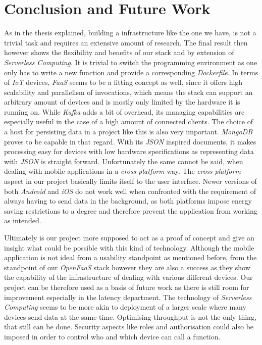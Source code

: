 \section{Conclusion and Future Work}
\label{sec:conclusion}

As in the thesis explained, building a infrastructure like the one we have, is not a trivial task
and requires an extensive amount of research. The final result then however shows the flexibility
and benefits of our stack and by extension of \textit{Serverless Computing}. It is trivial to switch
the programming environment as one only has to write a new function and provide a corresponding
\textit{Dockerfile}. In terms of \textit{IoT} devices, \textit{FaaS} seems to be a fitting concept
as well, since it offers high scalability and parallelism of invocations, which means the stack can
support an arbitrary amount of devices and is mostly only limited by the hardware it is running on.
While \textit{Kafka} adds a bit of overhead, its managing capabilities are especially useful in the
case of a high amount of connected clients. The choice of a host for persisting data in a project
like this is also very important. \textit{MongoDB} proves to be capable in that regard. With its
\textit{JSON} inspired documents, it makes processing easy for devices with low hardware
specifications as representing data with \textit{JSON} is straight forward. Unfortunately the same
cannot be said, when dealing with mobile applications in a \textit{cross platform} way. The
\textit{cross platform} aspect in our project basically limits itself to the user interface. Newer
versions of both \textit{Android} and \textit{iOS} do not work well when confronted with the
requirement of always having to send data in the background, as both platforms impose energy saving
restrictions to a degree and therefore prevent the application from working as intended.

Ultimately is our project more supposed to act as a proof of concept and give an insight what could
be possible with this kind of technology. Although the mobile application is not ideal from a
usability standpoint as mentioned before, from the standpoint of our \textit{OpenFaaS} stack however
they are also a success as they show the capability of the infrastructure of dealing with various
different devices. Our project can be therefore used as a basis of future work as there is still
room for improvement especially in the latency department. The technology of \textit{Serverless
Computing} seems to be more akin to deployment of a larger scale where many devices send data at the
same time. Optimising throughput is not the only thing, that still can be done. Security aspects
like roles and authorisation could also be imposed in order to control who and which device can call
a function.
